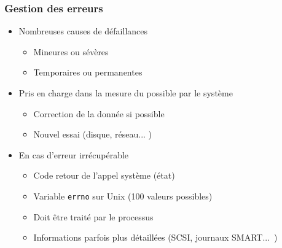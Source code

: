 \begin{frame}
\frametitle{Gestion des erreurs}
\begin{itemize}
\item Nombreuses causes de défaillances
\begin{itemize}
\item Mineures ou sévères
\item Temporaires ou permanentes
\end{itemize}
\item Pris en charge dans la mesure du possible par le système
\begin{itemize}
\item Correction de la donnée si possible
\item Nouvel essai (disque, réseau... )
\end{itemize}
\item En cas d'erreur irrécupérable 
\begin{itemize}
\item Code retour de l'appel système (état)
\item Variable \texttt{errno} sur Unix (100 valeurs possibles)
\item Doit être traité par le processus
\item Informations parfois plus détaillées (SCSI, journaux SMART...~)
\end{itemize}
\end{itemize}
\end{frame}



